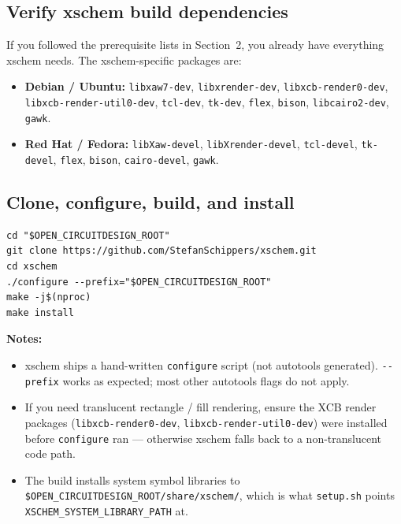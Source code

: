 \documentclass[11pt]{article}
\begin{document}
\subsection{Verify xschem build dependencies}

If you followed the prerequisite lists in Section~2, you already have
everything xschem needs. The xschem-specific packages are:

\begin{itemize}[leftmargin=2em]
  \item \textbf{Debian / Ubuntu:} \texttt{libxaw7-dev}, \texttt{libxrender-dev},
        \texttt{libxcb-render0-dev}, \texttt{libxcb-render-util0-dev},
        \texttt{tcl-dev}, \texttt{tk-dev}, \texttt{flex}, \texttt{bison},
        \texttt{libcairo2-dev}, \texttt{gawk}.
  \item \textbf{Red Hat / Fedora:} \texttt{libXaw-devel},
        \texttt{libXrender-devel}, \texttt{tcl-devel}, \texttt{tk-devel},
        \texttt{flex}, \texttt{bison}, \texttt{cairo-devel}, \texttt{gawk}.
\end{itemize}

\subsection{Clone, configure, build, and install}

\begin{lstlisting}
cd "$OPEN_CIRCUITDESIGN_ROOT"
git clone https://github.com/StefanSchippers/xschem.git
cd xschem
./configure --prefix="$OPEN_CIRCUITDESIGN_ROOT"
make -j$(nproc)
make install
\end{lstlisting}

\noindent\textbf{Notes:}
\begin{itemize}[leftmargin=2em]
  \item xschem ships a hand-written \texttt{configure} script (not autotools
        generated). \texttt{-{}-prefix} works as expected; most other
        autotools flags do not apply.
  \item If you need translucent rectangle / fill rendering, ensure the
        XCB render packages (\texttt{libxcb-render0-dev},
        \texttt{libxcb-render-util0-dev}) were installed before
        \texttt{configure} ran --- otherwise xschem falls back to a
        non-translucent code path.
  \item The build installs system symbol libraries to
        \texttt{\$OPEN\_CIRCUITDESIGN\_ROOT/share/xschem/}, which is what
        \texttt{setup.sh} points \texttt{XSCHEM\_SYSTEM\_LIBRARY\_PATH} at.
\end{itemize}
\end{document}
